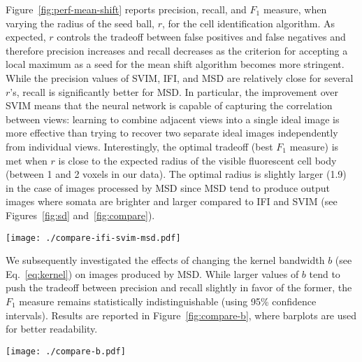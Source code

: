 \documentclass[smallextended]{svjour3}       %
\begin{document}
Figure~\ref{fig:perf-mean-shift} reports precision, recall, and $F_1$
measure, when varying the radius of the seed ball, $r$, for the cell
identification algorithm.  As expected, $r$ controls the
tradeoff between false positives and false negatives and therefore
precision increases and recall decreases as the criterion for
accepting a local maximum as a seed for the mean shift algorithm
becomes more stringent. While the precision values of SVIM, IFI, and
MSD are relatively close for several $r$'s, recall is significantly
better for MSD. In particular, the improvement over SVIM means that
the neural network is capable of capturing the correlation between
views: learning to combine adjacent views into a single ideal image is
more effective than trying to recover two separate ideal images
independently from individual views.  Interestingly, the optimal
tradeoff (best
$F_1$ measure) is met when $r$ is close to the expected radius of
the visible fluorescent cell body (between 1 and 2 voxels in our data).
The optimal radius is slightly larger (1.9) in the case of
images processed by MSD since MSD tend to produce output images where
somata are brighter and larger compared to IFI and SVIM (see
Figures~\ref{fig:sd} and~\ref{fig:compare}).


\begin{figure*}
  \centering
  \texttt{[image: ./compare-ifi-svim-msd.pdf]}
  \caption{Performance of mean shift after IFI, SVIM, and MSD when changing the seed radius $r$.}
  \label{fig:perf-mean-shift}
\end{figure*}

We subsequently investigated the effects of changing the kernel
bandwidth $b$ (see Eq.~\ref{eq:kernel}) on images produced by MSD. While larger values of $b$
tend to push the tradeoff between precision and recall slightly in
favor of the former, the $F_1$ measure remains statistically
indistinguishable (using 95\% confidence intervals). Results are
reported in Figure~\ref{fig:compare-b}, where barplots are used for
better readability.

\begin{figure*}
  \centering
  \texttt{[image: ./compare-b.pdf]}
  \caption{Performance of mean shift after MSD when changing the kernel bandwidth $b$ and the seed radius $r$.}
  \label{fig:compare-b}
\end{figure*}
\end{document}
